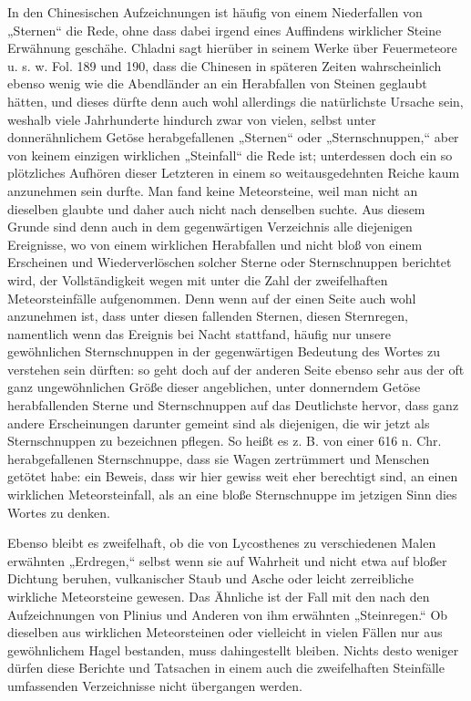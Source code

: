 \documentclass[a4paper, 11pt, oneside, polutonikogreek, german]{article}
\begin{document}
In den Chinesischen Aufzeichnungen ist häufig von einem Niederfallen von „Sternen“ die Rede, ohne dass dabei irgend eines Auffindens wirklicher Steine Erwähnung geschähe. Chladni sagt hierüber in seinem Werke über Feuermeteore u. s. w. Fol. 189 und 190, dass die Chinesen in späteren Zeiten wahrscheinlich ebenso wenig wie die Abendländer an ein Herabfallen von Steinen geglaubt hätten, und dieses dürfte denn auch wohl allerdings die natürlichste Ursache sein, weshalb viele Jahrhunderte hindurch zwar von vielen, selbst unter donnerähnlichem Getöse herabgefallenen „Sternen“ oder „Sternschnuppen,“ aber von keinem einzigen wirklichen „Steinfall“ die Rede ist; unterdessen doch ein so plötzliches Aufhören dieser Letzteren in einem so weitausgedehnten Reiche kaum anzunehmen sein durfte. Man fand keine Meteorsteine, weil man nicht an dieselben glaubte und daher auch nicht nach denselben suchte. Aus diesem Grunde sind denn auch in dem gegenwärtigen Verzeichnis alle diejenigen Ereignisse, wo von einem wirklichen Herabfallen und nicht bloß von einem Erscheinen und Wiederverlöschen solcher Sterne oder Sternschnuppen berichtet wird, der Vollständigkeit wegen mit unter die Zahl der zweifelhaften Meteorsteinfälle aufgenommen. Denn wenn auf der einen Seite auch wohl anzunehmen ist, dass unter diesen fallenden Sternen, diesen Sternregen, namentlich wenn das Ereignis bei Nacht stattfand, häufig nur unsere gewöhnlichen Sternschnuppen in der gegenwärtigen Bedeutung des Wortes zu verstehen sein dürften: so geht doch auf der anderen Seite ebenso sehr aus der oft ganz ungewöhnlichen Größe dieser angeblichen, unter donnerndem Getöse herabfallenden Sterne und Sternschnuppen auf das Deutlichste hervor, dass ganz andere Erscheinungen darunter gemeint sind als diejenigen, die wir jetzt als Sternschnuppen zu bezeichnen pflegen. So heißt es z. B. von einer 616 n. Chr. herabgefallenen Sternschnuppe, dass sie Wagen zertrümmert und Menschen getötet habe: ein Beweis, dass wir hier gewiss weit eher berechtigt sind, an einen wirklichen Meteorsteinfall, als an eine bloße Sternschnuppe im jetzigen Sinn dies Wortes zu denken.

Ebenso bleibt es zweifelhaft, ob die von Lycosthenes zu verschiedenen Malen erwähnten „Erdregen,“ selbst wenn sie auf Wahrheit und nicht etwa auf bloßer Dichtung beruhen, vulkanischer Staub und Asche oder leicht zerreibliche wirkliche Meteorsteine gewesen. Das Ähnliche ist der Fall mit den nach den Aufzeichnungen von Plinius und Anderen von ihm erwähnten „Steinregen.“ Ob dieselben aus wirklichen Meteorsteinen oder vielleicht in vielen Fällen nur aus gewöhnlichem Hagel bestanden, muss dahingestellt bleiben. Nichts desto weniger dürfen diese Berichte und Tatsachen in einem auch die zweifelhaften Steinfälle umfassenden Verzeichnisse nicht übergangen werden.
\end{document}
